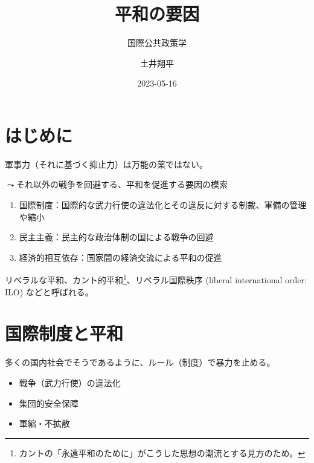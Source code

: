 \documentclass[
  xelatex,
  ja=standard]{bxjsarticle}
\title{平和の要因}
\subtitle{国際公共政策学}
\author{土井翔平}
\date{2023-05-16}
\providecommand{\tightlist}{%
  \setlength{\itemsep}{0pt}\setlength{\parskip}{0pt}}\usepackage{longtable,booktabs,array}
\begin{document}
\maketitle
\ifdefined\Shaded\renewenvironment{Shaded}{\begin{tcolorbox}[frame hidden, interior hidden, breakable, borderline west={3pt}{0pt}{shadecolor}, sharp corners, enhanced, boxrule=0pt]}{\end{tcolorbox}}\fi

\hypertarget{ux306fux3058ux3081ux306b}{%
\section*{はじめに}\label{ux306fux3058ux3081ux306b}}

軍事力（それに基づく抑止力）は万能の薬ではない。

\(\leadsto\)それ以外の戦争を回避する、平和を促進する要因の模索

\begin{enumerate}
\def\labelenumi{\arabic{enumi}.}
\tightlist
\item
  国際制度：国際的な武力行使の違法化とその違反に対する制裁、軍備の管理や縮小
\item
  民主主義：民主的な政治体制の国による戦争の回避
\item
  経済的相互依存：国家間の経済交流による平和の促進
\end{enumerate}

リベラルな平和、カント的平和\citep{oneal1997, oneal1999}\footnote{カントの「永遠平和のために」がこうした思想の潮流とする見方のため。}、リベラル国際秩序
(liberal international order: ILO)
\citep{ikenberry2009, ikenberry2018}などと呼ばれる。

\hypertarget{ux56fdux969bux5236ux5ea6ux3068ux5e73ux548c}{%
\section{国際制度と平和}\label{ux56fdux969bux5236ux5ea6ux3068ux5e73ux548c}}

多くの国内社会でそうであるように、ルール（制度）で暴力を止める。

\begin{itemize}
\tightlist
\item
  戦争（武力行使）の違法化
\item
  集団的安全保障
\item
  軍縮・不拡散
\end{itemize}
\end{document}
